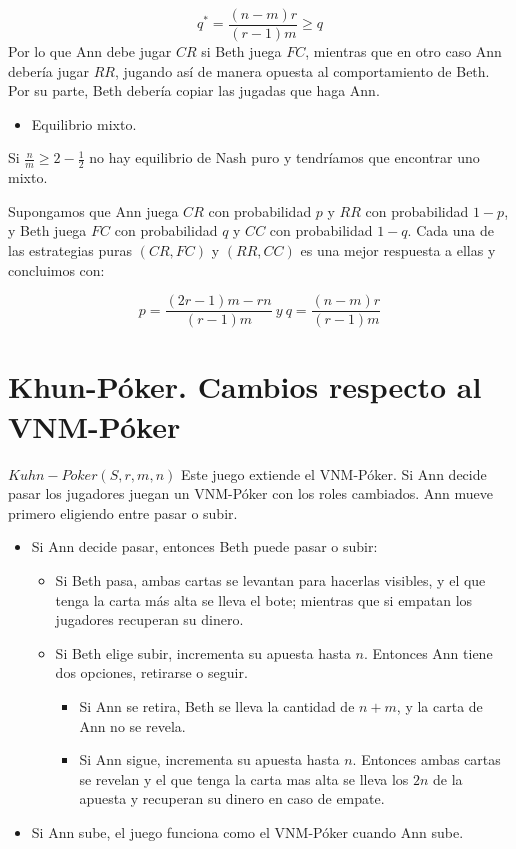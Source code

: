\documentclass[12pt,a4paper,]{book}
\providecommand{\tightlist}{%
  \setlength{\itemsep}{0pt}\setlength{\parskip}{0pt}}
\numberwithin{dummy}{section}
\theoremstyle{ocrenumbox}
\theoremstyle{blacknumex}
\theoremstyle{blacknumbox}
\theoremstyle{ocrenum}
\theoremstyle{ocrenum}
\begin{document}
\[
q^* = \frac{(n-m)r}{(r-1)m} \geq q
\] Por lo que Ann debe jugar \(CR\) si Beth juega \(FC\), mientras que
en otro caso Ann debería jugar \(RR\), jugando así de manera opuesta al
comportamiento de Beth. Por su parte, Beth debería copiar las jugadas
que haga Ann.

\begin{itemize}
\tightlist
\item
  Equilibrio mixto.
\end{itemize}

Si \(\frac{n}{m} \geq 2- \frac{1}{2}\) no hay equilibrio de Nash puro y
tendríamos que encontrar uno mixto.

Supongamos que Ann juega \(CR\) con probabilidad \(p\) y \(RR\) con
probabilidad \(1-p\), y Beth juega \(FC\) con probabilidad \(q\) y
\(CC\) con probabilidad \(1-q\). Cada una de las estrategias puras
\((CR,FC)\) y \((RR,CC)\) es una mejor respuesta a ellas y concluimos
con:

\[
p=\frac{(2r-1)m-rn}{(r-1)m} \ y \ q=\frac{(n-m)r}{(r-1)m}
\]

\hypertarget{Seccion52}{%
\section{Khun-Póker. Cambios respecto al VNM-Póker}\label{Seccion52}}

\textbf{\(Kuhn-Poker(S,r,m,n)\)} Este juego extiende el VNM-Póker. Si
Ann decide pasar los jugadores juegan un VNM-Póker con los roles
cambiados. Ann mueve primero eligiendo entre pasar o subir.

\begin{itemize}
\tightlist
\item
  Si Ann decide pasar, entonces Beth puede pasar o subir:

  \begin{itemize}
  \tightlist
  \item
    Si Beth pasa, ambas cartas se levantan para hacerlas visibles, y el
    que tenga la carta más alta se lleva el bote; mientras que si
    empatan los jugadores recuperan su dinero.
  \item
    Si Beth elige subir, incrementa su apuesta hasta \(n\). Entonces Ann
    tiene dos opciones, retirarse o seguir.

    \begin{itemize}
    \tightlist
    \item
      Si Ann se retira, Beth se lleva la cantidad de \(n+m\), y la carta
      de Ann no se revela.
    \item
      Si Ann sigue, incrementa su apuesta hasta \(n\). Entonces ambas
      cartas se revelan y el que tenga la carta mas alta se lleva los
      \(2n\) de la apuesta y recuperan su dinero en caso de empate.
    \end{itemize}
  \end{itemize}
\item
  Si Ann sube, el juego funciona como el VNM-Póker cuando Ann sube.
\end{itemize}
\end{document}
